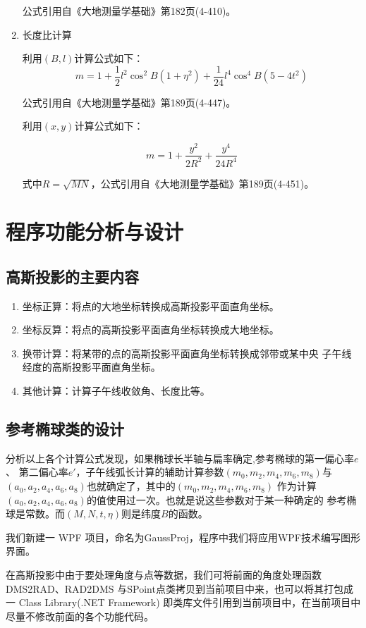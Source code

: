 \begin{enumerate}
公式引用自《大地测量学基础》第182页(4-410)。

\item 长度比计算

利用$(B, l)$计算公式如下：
$$m=1+\frac{1}{2}l^2 \cos ^2 B(1+\eta^2) + \frac{1}{24}l^4\cos ^4 B(5-4t^2)$$

公式引用自《大地测量学基础》第189页(4-447)。

利用$(x, y)$计算公式如下：

$$m=1+\frac{y^2}{2R^2} + \frac{y^4}{24R^4}$$

式中$R=\sqrt{MN}$，公式引用自《大地测量学基础》第189页(4-451)。

\end{enumerate}

\section{程序功能分析与设计}

\subsection{高斯投影的主要内容}
\begin{enumerate}
    \item 坐标正算：将点的大地坐标转换成高斯投影平面直角坐标。
    \item 坐标反算：将点的高斯投影平面直角坐标转换成大地坐标。
    \item 换带计算：将某带的点的高斯投影平面直角坐标转换成邻带或某中央
    子午线经度的高斯投影平面直角坐标。
    \item 其他计算：计算子午线收敛角、长度比等。
\end{enumerate}

\subsection{参考椭球类的设计}

分析以上各个计算公式发现，如果椭球长半轴与扁率确定,参考椭球的第一偏心率$e$、
第二偏心率$e'$，子午线弧长计算的辅助计算参数$(m_0, m_2, m_4, m_6, m_8)$与
$(a_0, a_2, a_4, a_6, a_8)$也就确定了，其中的$(m_0, m_2, m_4, m_6, m_8)$
作为计算$(a_0, a_2, a_4, a_6, a_8)$的值使用过一次。也就是说这些参数对于某一种确定的
参考椭球是常数。而$(M,N,t,\eta)$则是纬度$B$的函数。

我们新建一 WPF 项目，命名为GaussProj，程序中我们将应用WPF技术编写图形界面。

在高斯投影中由于要处理角度与点等数据，我们可将前面的角度处理函数DMS2RAD、RAD2DMS
与SPoint点类拷贝到当前项目中来，也可以将其打包成一 Class Library(.NET Framework)
即类库文件引用到当前项目中，在当前项目中尽量不修改前面的各个功能代码。

